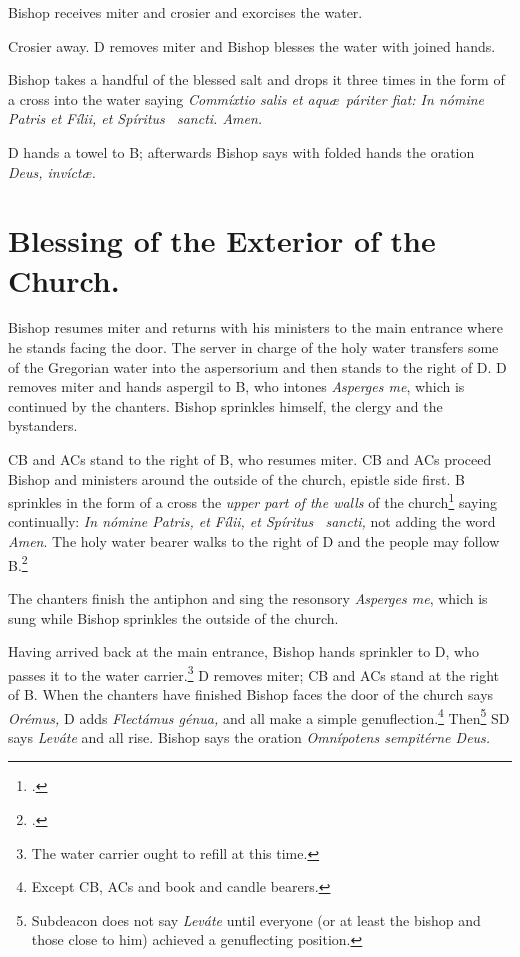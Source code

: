 \documentclass[letterpaper]{report}
\begin{document}
{\rubric Bishop receives miter and crosier and exorcises the water.

\rubric Crosier away. D removes miter and Bishop blesses the water with joined
hands.

\rubric Bishop takes a handful of the blessed salt and drops it three times in the
form of a cross into the water saying \textit{Commíxtio salis et aqu\ae\
páriter fiat: In nómine Pa\cross tris et Fí\cross lii, et Spíritus \cross\
sancti. \rbar Amen.}

\rubric D hands a towel to B; afterwards Bishop says with folded hands the oration
\textit{Deus, invíct\ae.}

\section{Blessing of the Exterior of the Church.}

\rubric Bishop resumes miter and returns with his ministers to the main entrance
where he stands facing the door. The server in charge of the holy water
transfers some of the Gregorian water into the aspersorium and then stands to
the right of D. D removes miter and hands aspergil to B, who intones
\textit{Asperges me}, which is continued by the chanters. Bishop sprinkles himself,
the clergy and the bystanders.

\rubric CB and ACs stand to the right of B, who resumes miter. CB and ACs
proceed Bishop and ministers around the outside of the church, epistle side first. B
sprinkles in the form of a cross the \textit{upper part of the walls} of the
church\footcite[The procession walks around and Bishop sprinkles the cemetery also
if it be adjacent.][n. 41, p. 44.]{consecranda} saying continually: \textit{In
nómine Pa\cross tris, et Fí\cross lii, et Spíritus \cross\ sancti,} not adding
the word \textit{Amen}. The holy water bearer walks to the right of D and the
people may follow B.\footcite[If it is impossible to go around the church, he
sprinkles the wall at his right as far as he can, then, passing by the front of
the church, he goes to the place at the other side of the church nearest the
point at which he stoped on the right side and begins to sprinkle the walls
from that point until he arrives at the main portal.][note 2, p.
44.]{consecranda}

\rubric The chanters finish the antiphon and sing the resonsory
\textit{Asperges me}, which is sung while Bishop sprinkles the outside of the
church.

\rubric Having arrived back at the main entrance, Bishop hands sprinkler to D, who
passes it to the water carrier.\footnote{The water carrier ought to refill at
this time.} D removes miter; CB and ACs stand at the right of B. When the
chanters have finished Bishop faces the door of the church says \textit{Orémus,} D
adds \textit{Flectámus génua,} and all make a simple
genuflection.\footnote{Except CB, ACs and book and candle bearers.}
Then\footnote{Subdeacon does not say \textit{Leváte} until everyone (or at
least the bishop and those close to him) achieved a genuflecting position.} SD
says \textit{Leváte} and all rise. Bishop says the oration \textit{Omnípotens
sempitérne Deus.}

}
\end{document}
